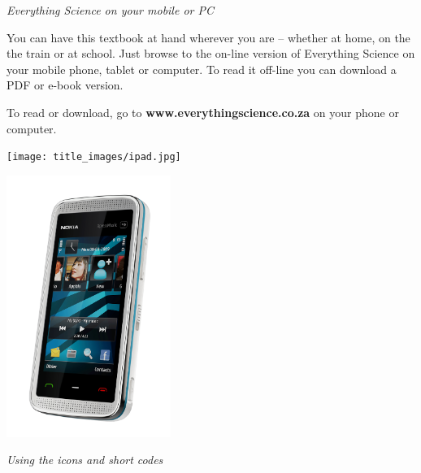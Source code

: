 \newpage
\thispagestyle{empty}

{\normalfont\sffamily\fontsize{22}\normalfont\itshape Everything Science on your mobile or PC} \par

{\Large
You can have this textbook at hand wherever you are – whether at home, on the the train or at school.
Just browse to the on-line version of Everything Science on your mobile phone, tablet or computer. To
read it off-line you can download a PDF or e-book version.\par


To read or download, go to \textbf{www.everythingscience.co.za} on your phone or computer.} \vspace*{2cm}


\begin{center}
\begin{minipage}{0.4\textwidth}
\centering
\texttt{[image: title\_images/ipad.jpg]}
\end{minipage}
\begin{minipage}{0.4\textwidth}
\centering
\includegraphics[width=0.4\textwidth]{title_images/phone.png}
\end{minipage}
\end{center}

\vspace*{2cm}


{\normalfont\sffamily\fontsize{22}\normalfont\itshape Using the icons and short codes} \par

